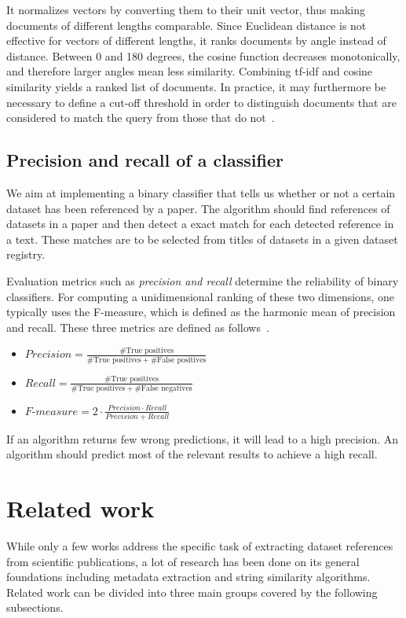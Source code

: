 \documentclass{IOS-Book-Article}
\begin{document}
It normalizes vectors by converting them to their unit vector, thus making documents of different lengths comparable.
Since Euclidean distance is not effective for vectors of different lengths, it ranks documents by angle instead of distance.
Between 0 and 180 degrees, the cosine function decreases monotonically, and therefore larger angles mean less similarity.
Combining tf-idf and cosine similarity yields a ranked list of documents.
In practice, it may furthermore be necessary to define a cut-off threshold in order to distinguish documents that are considered to match the query from those that do not~\citep{Joachims1997}.

\subsection{Precision and recall of a classifier}
\label{sec:precision-recall}
We aim at implementing a binary classifier that tells us whether or not a certain dataset has been referenced by a paper.
The algorithm should find references of datasets in a paper and then detect a exact match for each detected reference in a text.
These matches are to be selected from titles of datasets in a given dataset registry.

Evaluation metrics such as \emph{precision and recall} determine the reliability of binary classifiers.
For computing a unidimensional ranking of these two dimensions, one typically uses the F-measure, which is defined as the harmonic mean of precision and recall. 
These three metrics are defined as follows~\cite{Powers2011}. 
\begin{itemize}
	\item $\mathit{Precision}=\frac{\#\text{True\ positives}}{\#\text{True positives}+\#\text{False positives}}$
	\item $\mathit{Recall}=\frac{\#\text{True positives}}{\#\text{True positives}+\#\text{False negatives}}$
	\item $\textit{F-measure}=2\cdot{\frac{\mathit{Precision}\cdot\mathit{Recall}}{\mathit{Precision}+\mathit{Recall}}}$
\end{itemize}

If an algorithm returns few wrong predictions, it will lead to a high precision.
An algorithm should predict most of the relevant results to achieve a high recall.

\section{Related work}
\label{sec:relWork}
While only a few works address the specific task of extracting dataset references from scientific publications, a lot of research has been done on its general foundations including metadata extraction and string similarity algorithms. 
Related work can be divided into three main groups covered by the following subsections.
\end{document}
